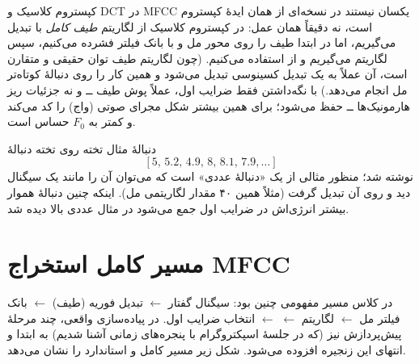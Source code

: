 \begin{correctionbox}{کپستروم کلاسیک و DCT در MFCC یکسان نیستند}
 در  نسخه‌ای از همان ایدهٔ کپستروم است، نه دقیقاً همان عمل: در کپستروم کلاسیک از لگاریتم \emph{طیف کامل} با  تبدیل می‌گیریم، اما در  ابتدا طیف را روی محور مل و با بانک فیلتر فشرده می‌کنیم، سپس لگاریتم می‌گیریم و از  استفاده می‌کنیم. (چون لگاریتم طیف توان حقیقی و متقارن است،  آن عملاً به یک تبدیل کسینوسی تبدیل می‌شود و  همین کار را روی دنبالهٔ کوتاه‌تر مل انجام می‌دهد.) با نگه‌داشتن فقط ضرایب اول، عملاً پوش طیف ــ و نه جزئیات ریز هارمونیک‌ها ــ حفظ می‌شود؛ برای همین  بیشتر شکل مجرای صوتی (واج) را کد می‌کند و کمتر به $F_0$ حساس است.
\end{correctionbox}

\begin{exambox}{دنبالهٔ مثال تخته}
روی تخته دنبالهٔ
\[[5,\,5.2,\,4.9,\,8,\,8.1,\,7.9,\ldots]\]
نوشته شد؛ منظور مثالی از یک «دنبالهٔ عددی» است که می‌توان آن را مانند یک سیگنال دید و روی آن تبدیل گرفت (مثلاً همین ۴۰ مقدار لگاریتمی مل). اینکه چنین دنبالهٔ هموار بیشتر انرژی‌اش در ضرایب اول جمع می‌شود در مثال عددی بالا دیده شد.
\end{exambox}

\section{مسیر کامل استخراج MFCC}

در کلاس مسیر مفهومی چنین بود: سیگنال گفتار $\leftarrow$ تبدیل فوریه (طیف) $\leftarrow$ بانک فیلتر مل $\leftarrow$ لگاریتم $\leftarrow$  $\leftarrow$ انتخاب ضرایب اول. در پیاده‌سازی واقعی، چند مرحلهٔ پیش‌پردازش نیز (که در جلسهٔ اسپکتروگرام با پنجره‌های زمانی آشنا شدیم) به ابتدا و انتهای این زنجیره افزوده می‌شود. شکل زیر مسیر کامل و استاندارد را نشان می‌دهد.

